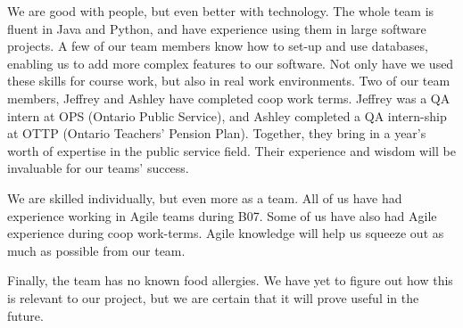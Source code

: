 \documentclass[12pt]{scrreprt}
\begin{document}
We are good with people, but even better with technology. The whole team is fluent in Java and Python, and have experience using them in large software projects. A few of our team members know how to set-up and use databases, enabling us to add more complex features to our software. Not only have we used these skills for course work, but also in real work environments. Two of our team members, Jeffrey and Ashley have completed coop work terms. Jeffrey was a QA intern at OPS (Ontario Public Service), and Ashley completed a QA intern-ship at OTTP (Ontario Teachers' Pension Plan). Together, they bring in a year's worth of expertise in the public service field. Their experience and wisdom will be invaluable for our teams' success. 

We are skilled individually, but even more as a team. All of us have had experience working in Agile teams during B07. Some of us have also had Agile experience during coop work-terms. Agile knowledge will help us squeeze out as much as possible from our team.

Finally, the team has no known food allergies. We have yet to figure out how this is relevant to our project, but we are certain that it will prove useful in the future.
\newpage
\end{document}
